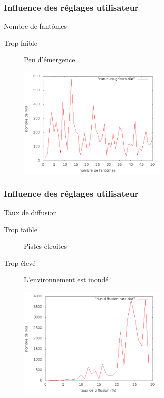 \documentclass{beamer}
\begin{document}
\begin{frame}

  \frametitle{Influence des réglages utilisateur}

  \begin{block}{Nombre de fantômes}
    \begin{description}
      \item[Trop faible]{Peu d'émergence}
    \end{description}
  \end{block}

  \vfill

  \begin{figure}
    \centering
    \includegraphics[width=7.2cm]{run-num-ghosts.png}
  \end{figure}

\end{frame}

\begin{frame}

  \frametitle{Influence des réglages utilisateur}

  \begin{block}{Taux de diffusion}
    \begin{description}
      \item[Trop faible]{Pistes étroites}
      \item[Trop élevé]{L'environnement est inondé}
    \end{description}
  \end{block}

  \vfill

  \begin{figure}
    \centering
    \includegraphics[width=7.2cm]{run-diffusion-rate.png}
  \end{figure}

\end{frame}
\end{document}
